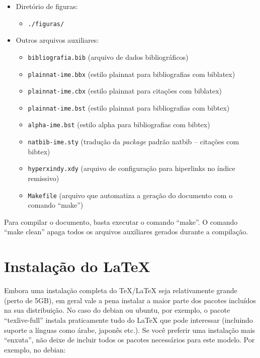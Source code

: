 \begin{itemize}
  \item Diretório de figuras:
  \begin{itemize}
    \item \texttt{./figuras/}
  \end{itemize}

  \item Outros arquivos auxiliares:
  \begin{itemize}
    \item \texttt{bibliografia.bib} (arquivo de dados bibliográficos)
    \item \texttt{plainnat-ime.bbx} (estilo plainnat para bibliografias com biblatex)
    \item \texttt{plainnat-ime.cbx} (estilo plainnat para citações com biblatex)
    \item \texttt{plainnat-ime.bst} (estilo plainnat para bibliografias com bibtex)
    \item \texttt{alpha-ime.bst} (estilo alpha para bibliografias com bibtex)
    \item \texttt{natbib-ime.sty} (tradução da \textit{package} padrão natbib -- citações com bibtex)
    \item \texttt{hyperxindy.xdy} (arquivo de configuração para hiperlinks no índice remissivo)
    \item \texttt{Makefile} (arquivo que automatiza a geração do documento com o comando ``make'')
  \end{itemize}
\end{itemize}

Para compilar o documento, basta executar o comando ``make''. O comando ``make
clean'' apaga todos os arquivos auxiliares gerados durante a compilação.

\section{Instalação do \LaTeX{}}

Embora uma instalação completa do \TeX{}/\LaTeX{} seja relativamente grande (perto
de 5GB), em geral vale a pena instalar a maior parte dos pacotes incluídos
na sua distribuição. No caso do debian ou ubuntu, por exemplo, o pacote
``texlive-full'' instala praticamente tudo do \LaTeX{} que pode interessar (incluindo
suporte a línguas como árabe, japonês etc.). Se você preferir uma instalação mais
``enxuta'', não deixe de incluir todos os pacotes necessários para este modelo.
Por exemplo, no debian:


